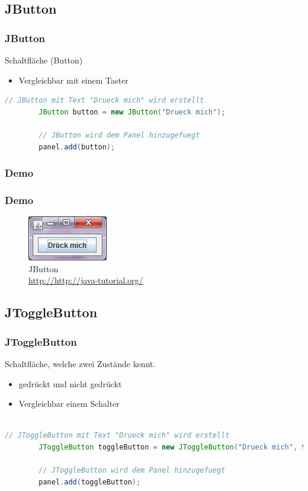 \documentclass[xcolor=dvipsnames]{beamer}
\begin{document}
\subsection{JButton}
\begin{frame}[fragile]  %
  \frametitle{JButton} %
  \begin{block}{Schaltfläche (Button)}
	  \begin{itemize}
		\item Vergleichbar mit einem Taster
	  \end{itemize}
  \end{block}
\begin{lstlisting}[language=java,basicstyle=\scriptsize\ttfamily]
// JButton mit Text "Drueck mich" wird erstellt
        JButton button = new JButton("Drueck mich");
 
        // JButton wird dem Panel hinzugefuegt
        panel.add(button);
\end{lstlisting}
\end{frame}

\subsubsection{Demo}
\begin{frame}
  \frametitle{Demo}
	\begin{figure}
		\includegraphics[scale=1.0]{images/jbutton.PNG}
		\caption{JButton \\ \tiny{\textcolor{gray}{\url{http://http://java-tutorial.org/}}}}
		\end{figure}
\end{frame}


\subsection{JToggleButton}
\begin{frame}  %
  \frametitle{JToggleButton} %
  \begin{block}{Schaltfläche, welche zwei Zustände kennt.}
	  \begin{itemize}
		\item gedrückt und nicht gedrückt
		\item Vergleichbar einem Schalter
	  \end{itemize}
  \end{block}

\begin{lstlisting}[language=java,basicstyle=\scriptsize\ttfamily]

// JToggleButton mit Text "Drueck mich" wird erstellt
        JToggleButton toggleButton = new JToggleButton("Drueck mich", true);
 
        // JToggleButton wird dem Panel hinzugefuegt
        panel.add(toggleButton);

\end{lstlisting}

\end{frame}
\end{document}
